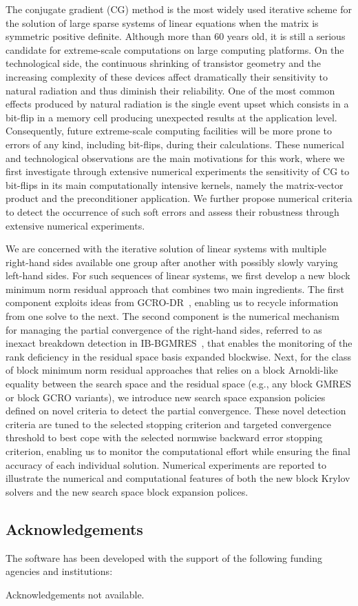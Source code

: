 \begin{description}
    The conjugate gradient (CG) method is the most widely used iterative scheme for the solution of large sparse systems of linear equations when the matrix is symmetric positive definite. Although more than 60 years old, it is still a serious candidate for extreme-scale computations on large computing platforms. On the technological side, the continuous shrinking of transistor geometry and the increasing complexity of these devices affect dramatically their sensitivity to natural radiation and thus diminish their reliability. One of the most common effects produced by natural radiation is the single event upset which consists in a bit-flip in a memory cell producing unexpected results at the application level. Consequently, future extreme-scale computing facilities will be more prone to errors of any kind, including bit-flips, during their calculations. These numerical and technological observations are the main motivations for this work, where we first investigate through extensive numerical experiments the sensitivity of CG to bit-flips in its main computationally intensive kernels, namely the matrix-vector product and the preconditioner application. We further propose numerical criteria to detect the occurrence of such soft errors and assess their robustness through extensive numerical experiments.
    \item[\fullcite{giraud_block_2022}]
        We are concerned with the iterative solution of linear systems with multiple right-hand sides available one group after another with possibly slowly varying left-hand sides. For such sequences of linear systems, we first develop a new block minimum norm residual approach that combines two main ingredients. The first component exploits ideas from GCRO-DR~\cite{parks_recycling_2006}, enabling us to recycle information from one solve to the next. The second component is the numerical mechanism for managing the partial convergence of the right-hand sides, referred to as inexact breakdown detection in IB-BGMRES~\cite{robbe_exact_2006}, that enables the monitoring of the rank deficiency in the residual space basis expanded blockwise. Next, for the class of block minimum norm residual approaches that relies on a block Arnoldi-like equality between the search space and the residual space (e.g., any block GMRES or block GCRO variants), we introduce new search space expansion policies defined on novel criteria to detect the partial convergence. These novel detection criteria are tuned to the selected stopping criterion and targeted convergence threshold to best cope with the selected normwise backward error stopping criterion, enabling us to monitor the computational effort while ensuring the final accuracy of each individual solution. Numerical experiments are reported to illustrate the numerical and computational features of both the new block Krylov solvers and the new search space block expansion polices.
\end{description}

\subsection{Acknowledgements}
\label{sec::Composyx:acknowledgements}

The software has been developed with the support of the following funding agencies and institutions: 




Acknowledgements not available.


